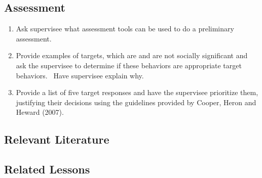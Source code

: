 \subsection{Assessment}
\begin{enumerate}
\item Ask supervisee what assessment tools can be used to do a preliminary assessment. 
\item Provide examples of targets, which are and are not socially significant and ask the supervisee to determine if these behaviors are appropriate target behaviors.  Have supervisee explain why. 
\item Provide a list of five target responses and have the supervisee prioritize them, justifying their decisions using the guidelines provided by Cooper, Heron and Heward (2007).
\end{enumerate}
%
\subsection{Relevant Literature}
\begin{refsection}
\nocite{bailey2013ethics,
        cooper2007applied,
        hawkins1979functions,
        linehan1977issues,
        van1979social}
\printbibliography[heading=none]
\end{refsection}
%
\subsection{Related Lessons} 
\fouriOne{}\\
\fouriTwo{}\\
\fourjOne{}\\
